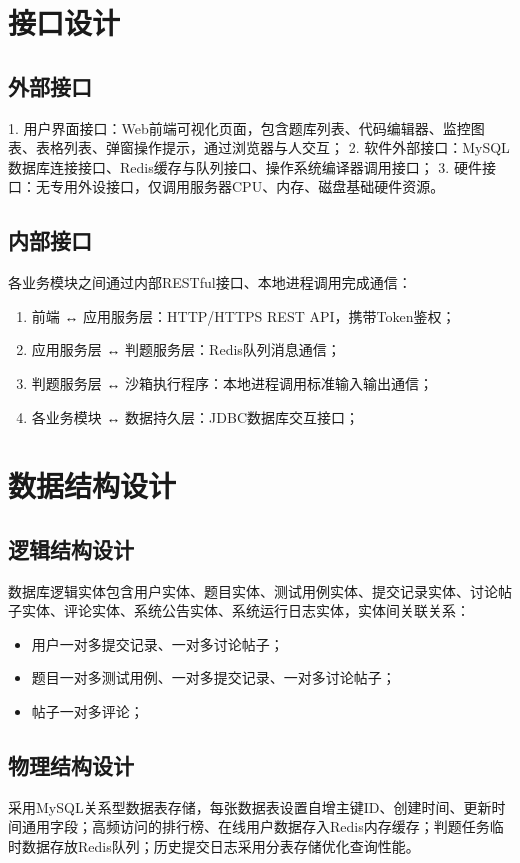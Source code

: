 \documentclass{../template/softeng}
\begin{document}
\section{接口设计}
\subsection{外部接口}
1. 用户界面接口：Web前端可视化页面，包含题库列表、代码编辑器、监控图表、表格列表、弹窗操作提示，通过浏览器与人交互；
2. 软件外部接口：MySQL数据库连接接口、Redis缓存与队列接口、操作系统编译器调用接口；
3. 硬件接口：无专用外设接口，仅调用服务器CPU、内存、磁盘基础硬件资源。

\subsection{内部接口}
各业务模块之间通过内部RESTful接口、本地进程调用完成通信：
\begin{enumerate}
    \item 前端 ↔ 应用服务层：HTTP/HTTPS REST API，携带Token鉴权；
    \item 应用服务层 ↔ 判题服务层：Redis队列消息通信；
    \item 判题服务层 ↔ 沙箱执行程序：本地进程调用标准输入输出通信；
    \item 各业务模块 ↔ 数据持久层：JDBC数据库交互接口；
\end{enumerate}

\section{数据结构设计}
\subsection{逻辑结构设计}
数据库逻辑实体包含用户实体、题目实体、测试用例实体、提交记录实体、讨论帖子实体、评论实体、系统公告实体、系统运行日志实体，实体间关联关系：
\begin{itemize}
    \item 用户一对多提交记录、一对多讨论帖子；
    \item 题目一对多测试用例、一对多提交记录、一对多讨论帖子；
    \item 帖子一对多评论；
\end{itemize}

\subsection{物理结构设计}
采用MySQL关系型数据表存储，每张数据表设置自增主键ID、创建时间、更新时间通用字段；高频访问的排行榜、在线用户数据存入Redis内存缓存；判题任务临时数据存放Redis队列；历史提交日志采用分表存储优化查询性能。
\end{document}
